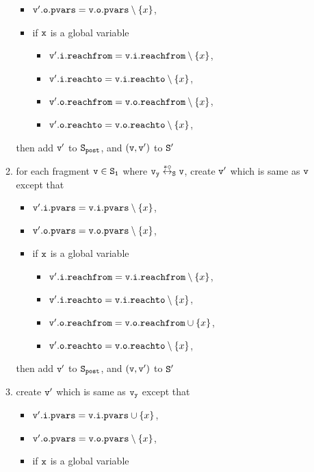 \begin{itemize}
\begin{enumerate}
\begin{itemize}
\item $\mathtt{v}'.\mathtt{o}.\mathtt{pvars} = \mathtt{v}.\mathtt{o}.\mathtt{pvars} \setminus \left\{x\right\}$,
\item if $\tt x$ is a global variable
\begin{itemize}
\item $\mathtt{v}'.\mathtt{i}.\mathtt{reachfrom} = \mathtt{v}.\mathtt{i}.\mathtt{reachfrom} \setminus \left\{x\right\}$,
\item $\mathtt{v}'.\mathtt{i}.\mathtt{reachto} = \mathtt{v}.\mathtt{i}.\mathtt{reachto} \setminus \left\{x\right\}$,
\item $\mathtt{v}'.\mathtt{o}.\mathtt{reachfrom} = \mathtt{v}.\mathtt{o}.\mathtt{reachfrom} \setminus \left\{x\right\}$,
\item $\mathtt{v}'.\mathtt{o}.\mathtt{reachto} = \mathtt{v}.\mathtt{o}.\mathtt{reachto} \setminus \left\{x\right\}$,
\end{itemize}
\end{itemize}
then add $\tt v'$ to $\tt S_{post}$, and $\tt (v,v')$ to $\tt S'$
\item for each fragment $\tt v \in S_1$ where $\tt v_y \overset{*\circ}\leftrightarrow_S v$, create $\tt v'$ which is same as $\tt v$ except that
\begin{itemize}
\item $\mathtt{v}'.\mathtt{i}.\mathtt{pvars} = \mathtt{v}.\mathtt{i}.\mathtt{pvars} \setminus \left\{x\right\}$,
\item $\mathtt{v}'.\mathtt{o}.\mathtt{pvars} = \mathtt{v}.\mathtt{o}.\mathtt{pvars} \setminus \left\{x\right\}$,
\item if $\tt x$ is a global variable
\begin{itemize}
\item $\mathtt{v}'.\mathtt{i}.\mathtt{reachfrom} = \mathtt{v}.\mathtt{i}.\mathtt{reachfrom} \setminus \left\{x\right\}$,
\item $\mathtt{v}'.\mathtt{i}.\mathtt{reachto} = \mathtt{v}.\mathtt{i}.\mathtt{reachto} \setminus \left\{x\right\}$,
\item $\mathtt{v}'.\mathtt{o}.\mathtt{reachfrom} = \mathtt{v}.\mathtt{o}.\mathtt{reachfrom} \cup \left\{x\right\}$,
\item $\mathtt{v}'.\mathtt{o}.\mathtt{reachto} = \mathtt{v}.\mathtt{o}.\mathtt{reachto} \setminus \left\{x\right\}$,
\end{itemize}
\end{itemize}
then add $\tt v'$ to $\tt S_{post}$, and $\tt (v,v')$ to $\tt S'$
\item create $\tt v'$ which is same as $\tt v_y$ except that
\begin{itemize}
\item $\mathtt{v}'.\mathtt{i}.\mathtt{pvars} = \mathtt{v}.\mathtt{i}.\mathtt{pvars} \cup \left\{x\right\}$,
\item $\mathtt{v}'.\mathtt{o}.\mathtt{pvars} = \mathtt{v}.\mathtt{o}.\mathtt{pvars} \setminus \left\{x\right\}$,
\item if $\tt x$ is a global variable

\end{itemize}
\end{enumerate}
\end{itemize}
